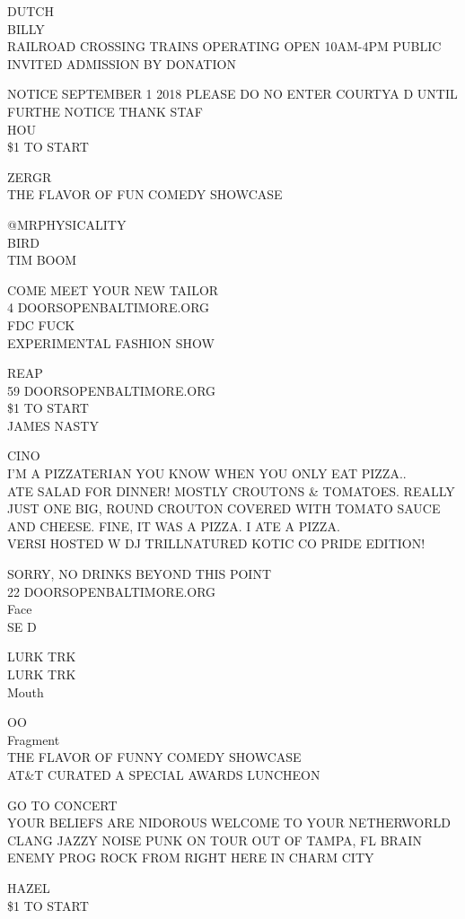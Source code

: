 \documentclass[10pt,letterpaper]{article}
\begin{document}
DUTCH\\
BILLY\\
RAILROAD CROSSING TRAINS OPERATING OPEN 10AM{-}4PM PUBLIC INVITED ADMISSION BY DONATION

NOTICE SEPTEMBER 1 2018 PLEASE DO NO ENTER COURTYA D UNTIL FURTHE NOTICE THANK STAF\\
HOU\\
\$1 TO START

ZERGR\\
THE FLAVOR OF FUN COMEDY SHOWCASE

@MRPHYSICALITY\\
BIRD\\
TIM BOOM

COME MEET YOUR NEW TAILOR\\
4 DOORSOPENBALTIMORE.ORG\\
FDC FUCK\\
EXPERIMENTAL FASHION SHOW

REAP\\
59 DOORSOPENBALTIMORE.ORG\\
\$1 TO START\\
JAMES NASTY

CINO\\
I'M A PIZZATERIAN YOU KNOW WHEN YOU ONLY EAT PIZZA..\\
ATE SALAD FOR DINNER!  MOSTLY CROUTONS \& TOMATOES.  REALLY JUST ONE BIG, ROUND CROUTON COVERED WITH TOMATO SAUCE AND CHEESE.  FINE, IT WAS A PIZZA.  I ATE A PIZZA.\\
VERSI HOSTED W DJ TRILLNATURED KOTIC CO PRIDE EDITION!

SORRY, NO DRINKS BEYOND THIS POINT\\
22 DOORSOPENBALTIMORE.ORG\\
Face\\
SE D

LURK TRK\\
LURK TRK\\
Mouth

OO\\
Fragment\\
THE FLAVOR OF FUNNY COMEDY SHOWCASE\\
AT\&T CURATED A SPECIAL AWARDS LUNCHEON

GO TO CONCERT\\
YOUR BELIEFS ARE NIDOROUS WELCOME TO YOUR NETHERWORLD\\
CLANG JAZZY NOISE PUNK ON TOUR OUT OF TAMPA, FL BRAIN ENEMY PROG ROCK FROM RIGHT HERE IN CHARM CITY

HAZEL\\
\$1 TO START
\end{document}
